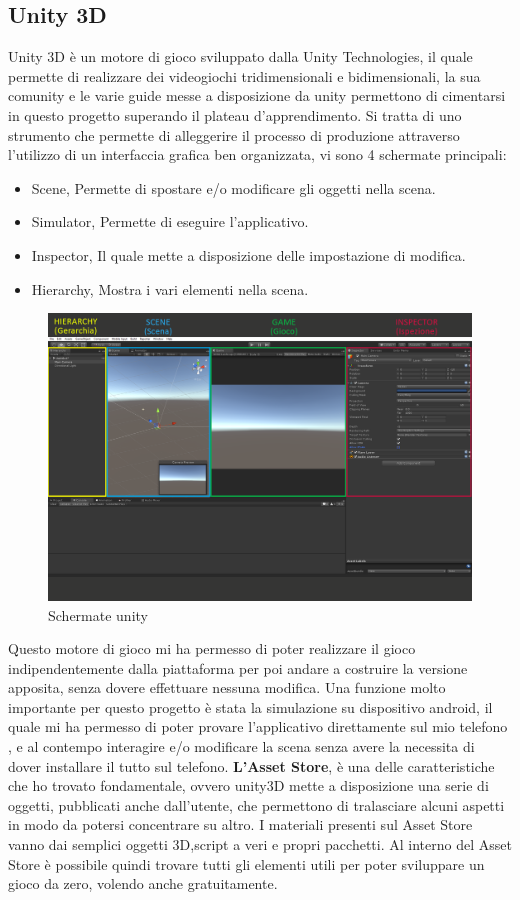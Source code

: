 \documentclass[
a4paper,
cleardoublepage=empty,
headings=twolinechapter,
numbers=autoenddot,
]{scrbook}
\begin{document}
    \subsection{Unity 3D}\label{unity3D}
    Unity 3D è un motore di gioco sviluppato dalla Unity
    Technologies, il quale permette di realizzare dei videogiochi tridimensionali e bidimensionali, la sua comunity e le varie guide messe a disposizione da unity permettono di cimentarsi in questo progetto superando il plateau d'apprendimento.
    Si tratta di uno strumento che permette di alleggerire il processo di produzione attraverso l'utilizzo di un interfaccia grafica ben organizzata, vi sono 4 schermate principali:
    \begin{itemize}
    	\item Scene, Permette di spostare e/o modificare gli oggetti nella scena.
    	\item Simulator, Permette di eseguire l'applicativo.
    	\item Inspector, Il quale mette a disposizione delle impostazione di modifica.
    	\item Hierarchy, Mostra i vari elementi nella scena.
    \end{itemize}
    \begin{figure}[H]
    	\centering
    	\includegraphics[width=0.8\linewidth]{image/unity}
    	\caption{Schermate unity}
    	\label{fig:unity}
    \end{figure}
    Questo motore di gioco mi ha permesso  di poter realizzare il gioco indipendentemente dalla piattaforma per poi andare a costruire la versione apposita, senza dovere effettuare nessuna modifica.
    Una funzione molto importante per questo progetto è stata la simulazione su dispositivo android, il quale mi ha permesso di poter provare l'applicativo direttamente sul mio telefono , e al contempo interagire e/o modificare la scena senza avere la necessita di dover installare il tutto sul telefono.
    \textbf{L'Asset Store}, è una delle caratteristiche che ho trovato fondamentale, ovvero unity3D mette a disposizione una serie di oggetti, pubblicati anche dall'utente, che permettono di tralasciare alcuni aspetti in modo da potersi concentrare su altro.
    I materiali presenti sul Asset Store vanno dai semplici oggetti 3D,script a veri e propri pacchetti.
    Al interno del Asset Store è possibile quindi trovare tutti gli elementi utili per poter sviluppare un gioco da zero, volendo anche gratuitamente.
\end{document}
